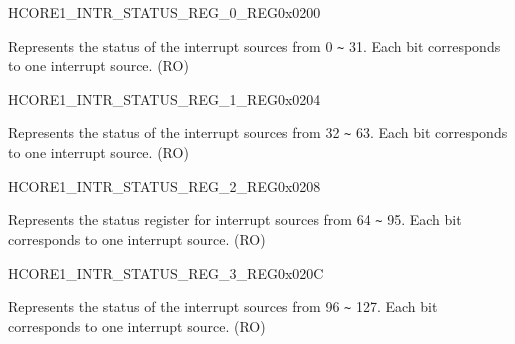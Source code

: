 \begin{register}{H}{CORE1\_INTR\_STATUS\_REG\_0\_REG}{0x0200}\label{regdesc:CORE1INTRSTATUSREG0REG}
%
\regnewline%
\begin{regdesc}\begin{reglist}
\label{fielddesc:CORE1INTRSTATUS0}\item [CORE1\_INTR\_STATUS\_0] Represents the status of the interrupt sources from 0 \verb+~+ 31. Each bit corresponds to one interrupt source.  (RO)
\end{reglist}\end{regdesc}
\end{register}


\begin{register}{H}{CORE1\_INTR\_STATUS\_REG\_1\_REG}{0x0204}\label{regdesc:CORE1INTRSTATUSREG1REG}
%
\regnewline%
\begin{regdesc}\begin{reglist}
\label{fielddesc:CORE1INTRSTATUS1}\item [CORE1\_INTR\_STATUS\_1] Represents the status of the interrupt sources from 32 \verb+~+ 63. Each bit corresponds to one interrupt source. (RO)
\end{reglist}\end{regdesc}
\end{register}


\begin{register}{H}{CORE1\_INTR\_STATUS\_REG\_2\_REG}{0x0208}\label{regdesc:CORE1INTRSTATUSREG2REG}
%
\regnewline%
\begin{regdesc}\begin{reglist}
\label{fielddesc:CORE1INTRSTATUS2}\item [CORE1\_INTR\_STATUS\_2] Represents the status register for interrupt sources from 64 \verb+~+ 95. Each bit corresponds to one interrupt source. (RO)
\end{reglist}\end{regdesc}
\end{register}


\begin{register}{H}{CORE1\_INTR\_STATUS\_REG\_3\_REG}{0x020C}\label{regdesc:CORE1INTRSTATUSREG3REG}
%
\regnewline%
\begin{regdesc}\begin{reglist}
\label{fielddesc:CORE1INTRSTATUS3}\item [CORE1\_INTR\_STATUS\_3] Represents the status of the interrupt sources from 96 \verb+~+ 127. Each bit corresponds to one interrupt source. (RO)
\end{reglist}\end{regdesc}
\end{register}


